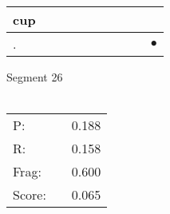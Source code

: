 \documentclass[landscape]{article}
\newcommand{\ssp}{\hspace{2pt}}
\newcommand{\mex}{\cellcolor{g}$\bullet$}
\begin{document}
\begin{tabular}{|l|p{10pt}|p{10pt}|p{10pt}|p{10pt}|p{10pt}|p{10pt}|p{10pt}|p{10pt}|p{10pt}|}
\hline
\ssp cup \ssp&\hspace{2pt}&\hspace{2pt}&\hspace{2pt}&\hspace{2pt}&\hspace{2pt}&\hspace{2pt}&\hspace{2pt}&\hspace{2pt}&\hspace{2pt}\\
\hline
\ssp \cellcolor{ref8}. \ssp&\hspace{2pt}&\hspace{2pt}&\hspace{2pt}&\hspace{2pt}&\hspace{2pt}&\hspace{2pt}&\hspace{2pt}&\hspace{2pt}&\hspace{2pt}\mex\\
\hline
\end{tabular}

\vspace{6pt}
\noindent Segment 26\\\\
\noindent\begin{tabular}{lm{12pt}r}
\hline
P:&&0.188\\
R:&&0.158\\
Frag:&&0.600\\
Score:&&0.065\\
\end{tabular}

\newpage
\end{document}
